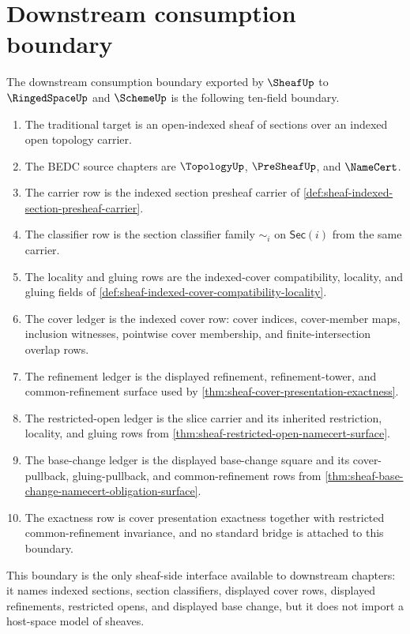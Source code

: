 \section{Downstream consumption boundary}
\label{sec:sheaf-downstream-consumption-boundary}

\begin{definition}
\label{def:sheaf-downstream-consumption-boundary}
The downstream consumption boundary exported by $\SheafUp$ to $\RingedSpaceUp$ and $\SchemeUp$ is the following ten-field boundary.
\begin{enumerate}
\item The traditional target is an open-indexed sheaf of sections over an indexed open topology carrier.
\item The BEDC source chapters are $\TopologyUp$, $\PreSheafUp$, and $\NameCert$.
\item The carrier row is the indexed section presheaf carrier of \autoref{def:sheaf-indexed-section-presheaf-carrier}.
\item The classifier row is the section classifier family $\sim_i$ on $\mathsf{Sec}(i)$ from the same carrier.
\item The locality and gluing rows are the indexed-cover compatibility, locality, and gluing fields of \autoref{def:sheaf-indexed-cover-compatibility-locality}.
\item The cover ledger is the indexed cover row: cover indices, cover-member maps, inclusion witnesses, pointwise cover membership, and finite-intersection overlap rows.
\item The refinement ledger is the displayed refinement, refinement-tower, and common-refinement surface used by \autoref{thm:sheaf-cover-presentation-exactness}.
\item The restricted-open ledger is the slice carrier and its inherited restriction, locality, and gluing rows from \autoref{thm:sheaf-restricted-open-namecert-surface}.
\item The base-change ledger is the displayed base-change square and its cover-pullback, gluing-pullback, and common-refinement rows from \autoref{thm:sheaf-base-change-namecert-obligation-surface}.
\item The exactness row is cover presentation exactness together with restricted common-refinement invariance, and no standard bridge is attached to this boundary.
\end{enumerate}
This boundary is the only sheaf-side interface available to downstream chapters: it names indexed sections, section classifiers, displayed cover rows, displayed refinements, restricted opens, and displayed base change, but it does not import a host-space model of sheaves.
\end{definition}

